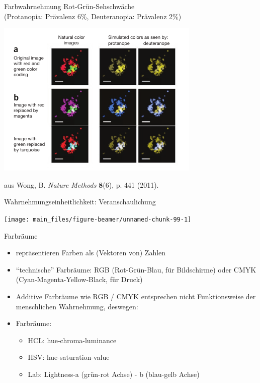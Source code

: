 \documentclass[
  10pt,
  ignorenonframetext,
]{beamer}
\providecommand{\tightlist}{%
  \setlength{\itemsep}{0pt}\setlength{\parskip}{0pt}}
\begin{document}
\begin{frame}{Farbwahrnehmung}
\label{farbwahrnehmung-1}
Rot-Grün-Sehschwäche\\
(Protanopia: Prävalenz 6\%, Deuteranopia: Prävalenz 2\%)

\includegraphics[height=.7\textheight]{pics/5-colorblind.png}

\begin{scriptsize} 
aus  Wong, B. \textit{Nature Methods} \textbf{8}(6), p. 441 (2011).
\end{scriptsize}
\end{frame}

\begin{frame}{Wahrnehmungseinheitlichkeit: Veranschaulichung}
\label{wahrnehmungseinheitlichkeit-veranschaulichung}
\scriptsize

\begin{center}\texttt{[image: main\_files/figure-beamer/unnamed-chunk-99-1]} \end{center}

\normalsize
\end{frame}

\begin{frame}{Farbräume}
\label{farbruxe4ume}
\begin{itemize}
\tightlist
\item
  repräsentieren Farben als (Vektoren von) Zahlen
\item
  ``technische'' Farbräume: RGB (Rot-Grün-Blau, für Bildschirme) oder
  CMYK (Cyan-Magenta-Yellow-Black, für Druck)
\item
  Additive Farbräume wie RGB / CMYK entsprechen nicht Funktionsweise der
  menschlichen Wahrnehmung, deswegen:
\item
  Farbräume:

  \begin{itemize}
  \tightlist
  \item
    HCL: hue-chroma-luminance
  \item
    HSV: hue-saturation-value
  \item
    Lab: Lightness-a (grün-rot Achse) - b (blau-gelb Achse)
  \end{itemize}
\end{itemize}
\end{frame}
\end{document}

